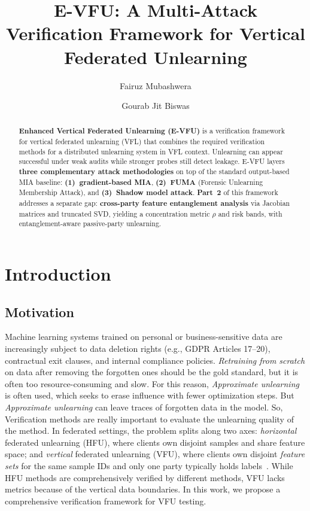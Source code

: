 \documentclass[sigconf,nonacm]{acmart}
\begin{document}
\title{E-VFU: A Multi-Attack Verification Framework for Vertical Federated Unlearning}

\author{Fairuz Mubashwera}

  \author{Gourab Jit Biswas}

\begin{abstract}
\textbf{Enhanced Vertical Federated Unlearning (E-VFU)} is a verification framework for vertical federated unlearning (VFL) that combines the required verification methods for a distributed unlearning system in VFL context. Unlearning can appear successful under weak audits while stronger probes still detect leakage. E-VFU layers \textbf{three complementary attack methodologies} on top of the standard output-based MIA baseline: \textbf{(1)~gradient-based MIA}, \textbf{(2)~FUMA} (Forensic Unlearning Membership Attack), and \textbf{(3)~Shadow model attack}. \textbf{Part~2} of this framework addresses a separate gap: \textbf{cross-party feature entanglement analysis} via Jacobian matrices and truncated SVD, yielding a concentration metric $\rho$ and risk bands, with entanglement-aware passive-party unlearning.

\end{abstract}


\maketitle

\section{Introduction}

\subsection{Motivation}
Machine learning systems trained on personal or business-sensitive data are increasingly subject to data deletion rights (e.g., GDPR Articles 17--20), contractual exit clauses, and internal compliance policies. \emph{Retraining from scratch} on data after removing the forgotten ones should be the gold standard, but it is often too resource-consuming and slow. For this reason, \emph{Approximate unlearning} is often used, which seeks to erase influence with fewer optimization steps. But \emph{Approximate unlearning} can leave traces of forgotten data in the model. So, Verification methods are really important to evaluate the unlearning quality of the method. In federated settings, the problem splits along two axes: \emph{horizontal} federated unlearning (HFU), where clients own disjoint samples and share feature space; and \emph{vertical} federated unlearning (VFU), where clients own disjoint \emph{feature sets} for the same sample IDs and only one party typically holds labels~\cite{varshney2025vfu,yang2019federated}. While HFU methods are comprehensively verified by different methods, VFU lacks metrics because of the vertical data boundaries. In this work, we propose a comprehensive verification framework for VFU testing.
\end{document}
